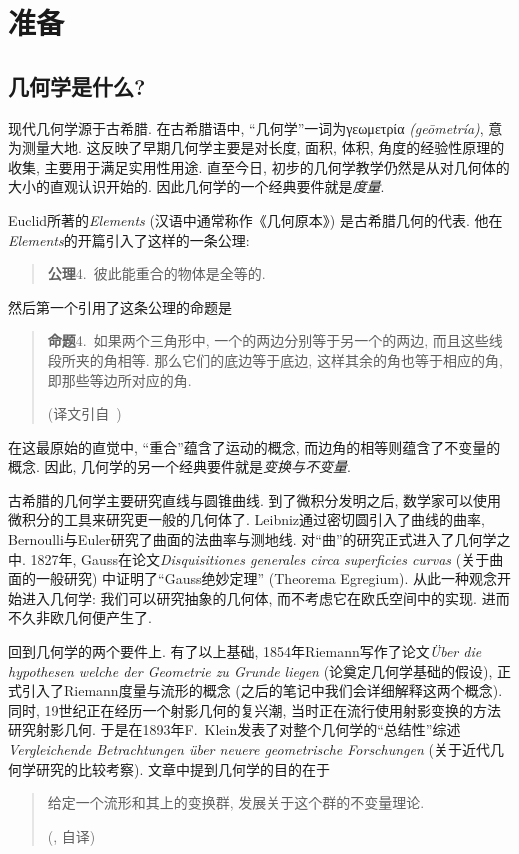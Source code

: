 \setcounter{chapter}{-1}
\chapter{准备}
\section{几何学是什么?}
现代几何学源于古希腊.
在古希腊语中, ``几何学''一词为{\greek γεωμετρία} \textit{(geōmetría)}, 意为测量大地.
这反映了早期几何学主要是对长度, 面积, 体积, 角度的经验性原理的收集, 主要用于满足实用性用途.
直至今日, 初步的几何学教学仍然是从对几何体的大小的直观认识开始的.
因此几何学的一个经典要件就是\emph{度量}.

Euclid所著的\textit{Elements} (汉语中通常称作《几何原本》) 是古希腊几何的代表.
他在\textit{Elements}的开篇引入了这样的一条公理:
\begin{quotation}
    {\bfseries 公理}4.\ 彼此能重合的物体是全等的.
\end{quotation}
然后第一个引用了这条公理的命题是
\begin{quotation}
    {\bfseries 命题}4.\ 如果两个三角形中, 一个的两边分别等于另一个的两边, 而且这些线段所夹的角相等.
    那么它们的底边等于底边, 这样其余的角也等于相应的角, 即那些等边所对应的角.\\
    \begin{flushright}
        (译文引自~\parencite{Euclid_Elem})
    \end{flushright}
\end{quotation}
在这最原始的直觉中, ``重合''蕴含了运动的概念, 而边角的相等则蕴含了不变量的概念.
因此, 几何学的另一个经典要件就是\emph{变换与不变量}.

古希腊的几何学主要研究直线与圆锥曲线.
到了微积分发明之后, 数学家可以使用微积分的工具来研究更一般的几何体了.
Leibniz通过密切圆引入了曲线的曲率, Bernoulli与Euler研究了曲面的法曲率与测地线.
对``曲''的研究正式进入了几何学之中.
1827年, Gauss在论文\textit{Disquisitiones generales circa superficies curvas} (关于曲面的一般研究) 中证明了``Gauss绝妙定理'' (Theorema Egregium).
从此一种观念开始进入几何学: 我们可以研究抽象的几何体, 而不考虑它在欧氏空间中的实现.
进而不久非欧几何便产生了.

回到几何学的两个要件上.
有了以上基础, 1854年Riemann写作了论文\textit{\"{U}ber die hypothesen welche der Geometrie zu Grunde liegen} (论奠定几何学基础的假设), 正式引入了Riemann度量与流形的概念 (之后的笔记中我们会详细解释这两个概念).
同时, 19世纪正在经历一个射影几何的复兴潮, 当时正在流行使用射影变换的方法研究射影几何.
于是在1893年F.\ Klein发表了对整个几何学的``总结性''综述\textit{Vergleichende Betrachtungen \"{u}ber neuere geometrische Forschungen} (关于近代几何学研究的比较考察).
文章中提到几何学的目的在于
\begin{quotation}
    给定一个流形和其上的变换群, 发展关于这个群的不变量理论.
    \begin{flushright}
        (\parencite{Klein_Erlangen}, 自译)
    \end{flushright}
\end{quotation}

